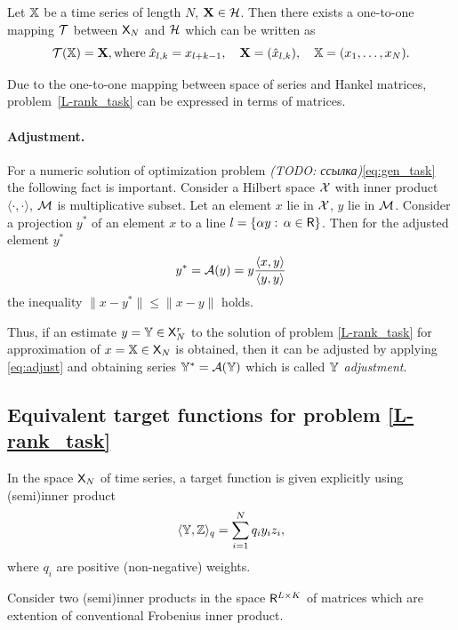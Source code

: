\documentclass[12pt,a4paper,fleqn,leqno]{article}
\begin{document}
Let $\mathbb{X}$ be a time series of length $N$, $\mathbf{X} \in \mathcal{H}$. Then there exists a one-to-one mapping $\mathcal{T}$ between $\mathsf{X}_N$ and $\mathcal{H}$ which can be written as
\begin{equation*}
\mathcal{T}(\mathbb{X}) = \mathbf{X}, \text{where} \; \hat x_{l, k} = x_{l + k - 1}, \quad \mathbf{X} = (\hat x_{l,k}), \quad \mathbb{X} = (x_1, \ldots, x_N).
\end{equation*}

Due to the one-to-one mapping between space of series and Hankel matrices,
problem~\eqref{L-rank_task} can be expressed in terms of matrices.

\paragraph{Adjustment.} For a numeric solution of optimization problem \emph{(TODO: ссылка)}\eqref{eq:gen_task} the following fact is important.
Consider a Hilbert space $\mathcal{X}$ with inner product $\langle\cdot, \cdot\rangle$, $\mathcal{M}$ is multiplicative subset. Let an element $x$ lie in $\mathcal{X}$, $y$ lie in $\mathcal{M}$. Consider a projection $y^*$ of an element $x$ to a line $l = \{\alpha y:\, \alpha \in \mathsf{R}\}$. Then for the adjusted element $y^*$
\begin{equation}
\label{eq:adjust}
y^* = \mathcal{A}(y)= y \frac{\langle x, y\rangle}{\langle y, y\rangle}
\end{equation}
the inequality $\|x - y^*\| \le \|x - y\|$ holds.

Thus, if an estimate $y=\mathbb{Y} \in \mathsf{X}_N^r$ to the solution of problem \eqref{L-rank_task} for approximation of $x=\mathbb{X} \in \mathsf{X}_N$ is obtained, then it can be adjusted by applying \eqref{eq:adjust} and obtaining series $\mathbb{Y}^*=\mathcal{A}(\mathbb{Y})$ which is called \emph{$\mathbb{Y}$ adjustment}.

\subsection{Equivalent target functions for problem \eqref{L-rank_task}}
In the space $\mathsf{X}_N$ of time series, a target function is given explicitly using (semi)inner product
\begin{equation}
\label{eq:norm_ser}
    \langle\mathbb{Y},\mathbb{Z}\rangle_q = \sum_{i = 1}^N q_i y_i z_i,
\end{equation}
where $q_i$ are positive (non-negative) weights.

Consider two (semi)inner products in the space $\mathsf{R}^{L \times K}$ of matrices which are extention of conventional Frobenius inner product.
\end{document}
